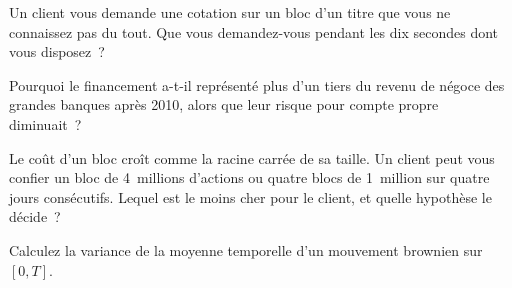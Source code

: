 \begin{interviewq}\label{iq:m1:the-sell-side:3}
Un client vous demande une cotation sur un bloc d'un titre que vous ne connaissez pas du tout.
Que vous demandez-vous pendant les dix secondes dont vous disposez~?
\end{interviewq}

\begin{interviewq}\label{iq:m1:the-sell-side:4}
Pourquoi le financement a-t-il représenté plus d'un tiers du revenu de négoce
des grandes banques après 2010, alors que leur risque pour compte propre diminuait~?
\end{interviewq}

\begin{interviewq}\label{iq:m1:the-sell-side:5}
Le coût d'un bloc croît comme la racine carrée de sa taille. Un client peut
vous confier un bloc de 4~millions d'actions ou quatre blocs de 1~million sur
quatre jours consécutifs. Lequel est le moins cher pour le client, et quelle
hypothèse le décide~?
\end{interviewq}

\begin{interviewq}\label{iq:m1:the-sell-side:6}
Calculez la variance de la moyenne temporelle d'un mouvement brownien sur $[0,T]$.
\end{interviewq}
